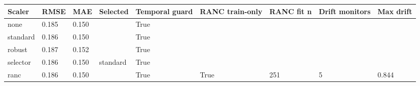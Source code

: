 \begin{tabular}{lllllllll}
\toprule
Scaler & RMSE & MAE & Selected & Temporal guard & RANC train-only & RANC fit n & Drift monitors & Max drift \\
\midrule
none & 0.185 & 0.150 &  & True &  &  &  &  \\
standard & 0.186 & 0.150 &  & True &  &  &  &  \\
robust & 0.187 & 0.152 &  & True &  &  &  &  \\
selector & 0.186 & 0.150 & standard & True &  &  &  &  \\
ranc & 0.186 & 0.150 &  & True & True & 251 & 5 & 0.844 \\
\bottomrule
\end{tabular}
